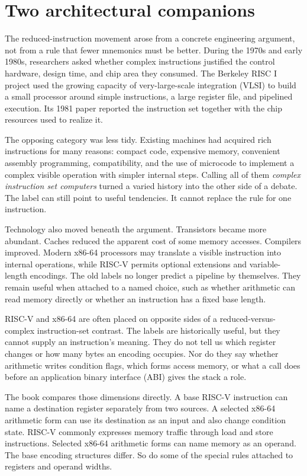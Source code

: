 \section{Two architectural companions}

The reduced-instruction movement arose from a concrete engineering argument,
not from a rule that fewer mnemonics must be better. During the 1970s and
early 1980s, researchers asked whether complex instructions justified the
control hardware, design time, and chip area they consumed. The Berkeley RISC
I project used the growing capacity of very-large-scale integration (VLSI) to
build a small processor around simple instructions, a large register file,
and pipelined execution. Its 1981 paper reported the instruction set together
with the chip resources used to realize it.\autocite{patterson1981risci}

The opposing category was less tidy. Existing machines had acquired rich
instructions for many reasons: compact code, expensive memory, convenient
assembly programming, compatibility, and the use of microcode to implement a
complex visible operation with simpler internal steps. Calling all of them
\emph{complex instruction set computers} turned a varied history into the
other side of a debate. The label can still point to useful tendencies. It
cannot replace the rule for one instruction.

Technology also moved beneath the argument. Transistors became more abundant.
Caches reduced the apparent cost of some memory accesses. Compilers improved.
Modern x86-64 processors may translate a visible instruction into internal
operations, while RISC-V permits optional extensions and variable-length
encodings. The old labels no longer predict a pipeline by themselves. They
remain useful when attached to a named choice, such as whether arithmetic can
read memory directly or whether an instruction has a fixed base length.

RISC-V and x86-64 are often placed on opposite sides of a reduced-versus-
complex instruction-set contrast. The labels are historically useful, but
they cannot supply an instruction's meaning. They do not tell us which
register changes or how many bytes an encoding occupies. Nor do they say
whether arithmetic writes condition flags, which forms access memory, or what
a call does before an application binary interface (ABI) gives the stack a
role.

The book compares those dimensions directly. A base RISC-V instruction can
name a destination register separately from two sources. A selected x86-64
arithmetic form can use its destination as an input and also change condition
state. RISC-V commonly expresses memory traffic through load and store
instructions. Selected x86-64 arithmetic forms can name memory as an operand.
The base encoding structures differ. So do some of the special rules attached
to registers and operand widths.

